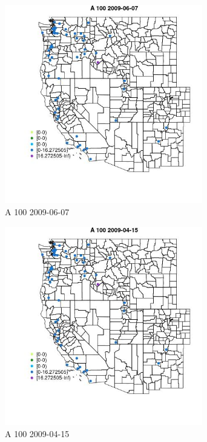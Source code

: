 \begin{figure} 
\centering  
\includegraphics[width=0.77\textwidth]{Code_Outputs/Report_ML_input_PM25_Step4_part_e_de_duplicated_aves_MapObsA_1002009-06-07.jpg} 
\caption{\label{fig:Report_ML_input_PM25_Step4_part_e_de_duplicated_avesMapObsA_1002009-06-07}A 100 2009-06-07} 
\end{figure} 
 

\begin{figure} 
\centering  
\includegraphics[width=0.77\textwidth]{Code_Outputs/Report_ML_input_PM25_Step4_part_e_de_duplicated_aves_MapObsA_1002009-04-15.jpg} 
\caption{\label{fig:Report_ML_input_PM25_Step4_part_e_de_duplicated_avesMapObsA_1002009-04-15}A 100 2009-04-15} 
\end{figure} 
 


